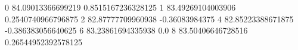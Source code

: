 0 84.09013366699219 0.8515167236328125
1 83.49269104003906 0.2540740966796875
2 82.87777709960938 -0.36083984375
4 82.85223388671875 -0.386383056640625
6 83.23861694335938 0.0
8 83.50406646728516 0.26544952392578125
